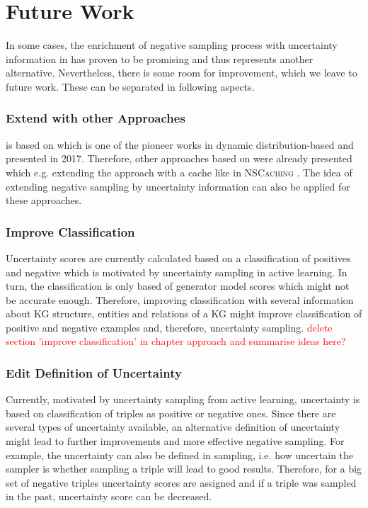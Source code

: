 \section{Future Work} 
\label{sec:futurework}

In some cases, the enrichment of negative sampling process with uncertainty information in \kbgan has proven to be promising and thus represents another alternative.
Nevertheless, there is some room for improvement, which we leave to future work.
These can be separated in following aspects.

\subsubsection{Extend \ucgan with other Approaches}

\ucgan is based on \kbgan which is one of the pioneer works in dynamic distribution-based and presented in 2017.
Therefore, other approaches based on \kbgan were already presented which e.g. extending the approach with a cache like in \textsc{NSCaching} \cite{zhang2019nscaching}.
The idea of extending negative sampling by uncertainty information can also be applied for these approaches.


\subsubsection{Improve Classification}
Uncertainty scores are currently calculated based on a classification of positives and negative which is motivated by uncertainty sampling in active learning.
In turn, the classification is only based of generator model scores which might not be accurate enough.
Therefore, improving classification with several information about \ac{KG} structure, entities and relations of a \ac{KG} might improve classification of positive and negative examples and, therefore, uncertainty sampling.
\textcolor{red}{delete section 'improve classification' in chapter approach and summarise ideas here?} 

\subsubsection{Edit Definition of Uncertainty}
Currently, motivated by uncertainty sampling from active learning, uncertainty is based on classification of triples as positive or negative ones.
Since there are several types of uncertainty available, an alternative definition of uncertainty might lead to further improvements and more effective negative sampling.
For example, the uncertainty can also be defined in sampling, i.e. how uncertain the sampler is whether sampling a triple will lead to good results.
Therefore, for a big set of negative triples uncertainty scores are assigned and if a triple was sampled in the past, uncertainty score can be decreased.

